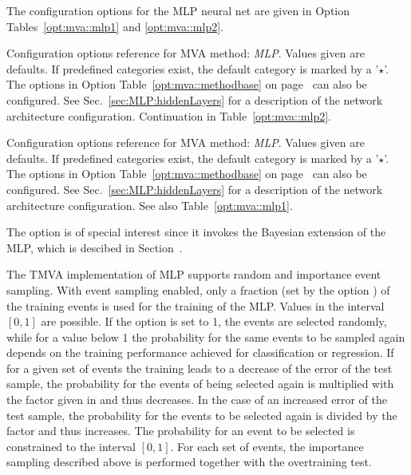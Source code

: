 The configuration options for the MLP neural net are given in Option
Tables~\ref{opt:mva::mlp1} and \ref{opt:mva::mlp2}.
\begin{option}[p]

\caption[.]{\optionCaptionSize
     Configuration options reference for MVA method: {\em MLP}.
     Values given are defaults. If predefined categories exist, the default category
     is marked by a '$\star$'. The options in Option Table~\ref{opt:mva::methodbase} on
     page~\pageref{opt:mva::methodbase} can also be configured.
     See Sec.~\ref{sec:MLP:hiddenLayers} for a description of the
     network architecture configuration. Continuation in Table~\ref{opt:mva::mlp2}.
}
\label{opt:mva::mlp1}
\end{option}
\begin{option}[t]

\caption[.]{\optionCaptionSize
     Configuration options reference for MVA method: {\em MLP}.
     Values given are defaults. If predefined categories exist, the default category
     is marked by a '$\star$'. The options in Option Table~\ref{opt:mva::methodbase} on
     page~\pageref{opt:mva::methodbase} can also be configured.
     See Sec.~\ref{sec:MLP:hiddenLayers} for a description of the
     network architecture configuration. See also Table~\ref{opt:mva::mlp1}.
}
\label{opt:mva::mlp2}
\end{option}
The option  is of special interest since it invokes the Bayesian extension of the MLP, which is descibed in Section~\label{sec:ann:bayes}.

The TMVA implementation of MLP supports random and importance event sampling. With
event sampling enabled, only a fraction (set by the option )
of the training events is used for the training of the MLP. Values in the interval
$[0,1]$ are possible. If the  option  is set to 1, the
events are selected randomly, while for a value below 1 the probability for the same
events to be sampled again depends on the training performance achieved for
classification or regression. If for a given set of events the training leads to a
decrease of the error of the test sample, the probability for the events of being
selected again is multiplied with the factor given in 
and thus decreases. In the case of an increased error of the test sample, the
probability for the events to be selected again is divided by the factor
 and thus increases. The probability for an event to
be selected is constrained to the interval $[0,1]$. For each set of events,
the importance sampling described above is performed together with the overtraining
test.

